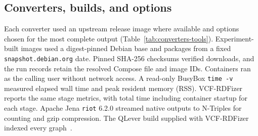 \documentclass[11pt]{article}
\begin{document}
\subsection{Converters, builds, and options}\label{subsec:converters-tools}
Each converter used an upstream release image where available and options chosen for the most complete output (Table~\ref{tab:converters-tools}).
Experiment-built images used a digest-pinned Debian base and packages from a fixed \texttt{snapshot.debian.org} date.
Pinned SHA-256 checksums verified downloads, and the run records retain the resolved Compose file and image IDs.
Containers ran as the calling user without network access.
A read-only BusyBox \texttt{time -v} measured elapsed wall time and peak resident memory (RSS).
VCF-RDFizer reports the same stage metrics, with total time including container startup for each stage.
Apache Jena \texttt{riot} 6.2.0 streamed native outputs to N-Triples for counting and gzip compression.
The QLever build supplied with VCF-RDFizer indexed every graph~\cite{qlever_2017}.
\end{document}
